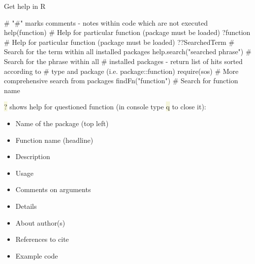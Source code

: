 \documentclass[compress, ucs, xelatex, 11pt, xcolor=svgnames, aspectratio=169,
	hyperref={
		bookmarks=true,
		unicode=true,
		colorlinks=true,
		pdftitle={Molecular data in R},
		plainpages=false,
		pdfauthor={Vojtech Zeisek},
		pdfsubject={Course about phylogeny and evolution in R},
		pdfcreator={XeLaTeX},
		pdfkeywords={R, evolution, phylogeny, molecular data},
		linkcolor=Crimson, %
		anchorcolor=Magenta, %
		citecolor=Magenta, %
		filecolor=Magenta, %
		menucolor=Magenta, %
		urlcolor=DodgerBlue, %
		pdftex},
	url={hyphens, lowtilde} %
	]{beamer}
\renewcommand{\texttt}[1]{\colorbox{Beige}{{\ttfamily #1}}}
\begin{document}
\begin{frame}[fragile]{Get help in R}
	\begin{spluscode}
    # "#" marks comments - notes within code which are not executed
    help(function) # Help for particular function (package must be loaded)
    ?function # Help for particular function (package must be loaded)
    ??SearchedTerm # Search for the term within all installed packages
    help.search("searched phrase") # Search for the phrase within all
      # installed packages - return list of hits sorted according to
      # type and package (i.e. package::function)
    require(sos) # More comprehensive search from packages
    findFn("function") # Search for function name
	\end{spluscode}
	\vfill
	\alert{\texttt{?}} shows help for questioned function (in console type \texttt{q} to close it):
	\vfill
	\begin{multicols}{2}
		\begin{itemize}
			\item Name of the package (top left)
			\item Function name (headline)
			\item Description
			\item Usage
			\item Comments on arguments
			\item Details
			\item About author(s)
			\item References to cite
			\item Example code
		\end{itemize}
	\end{multicols}
\end{frame}
\end{document}
